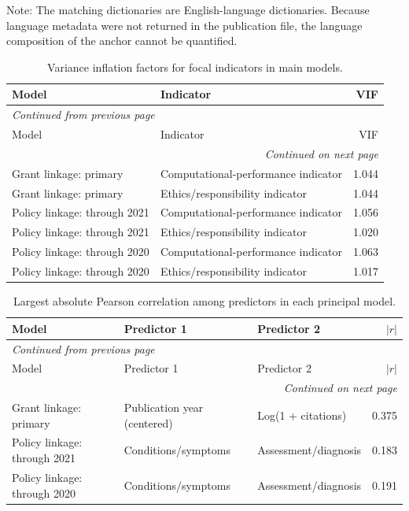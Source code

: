 \documentclass[11pt]{article}
\begin{document}
\noindent\small Note: The matching dictionaries are English-language dictionaries. Because language metadata were not returned in the publication file, the language composition of the anchor cannot be quantified.

\begin{longtable}{p{5.2cm}p{4.0cm}r}
\caption{Variance inflation factors for focal indicators in main models.}\label{tab:s10-vif}\\
\toprule
Model & Indicator & VIF \\
\midrule
\endfirsthead
\multicolumn{3}{l}{\small\itshape Continued from previous page} \\
\toprule
Model & Indicator & VIF \\
\midrule
\endhead
\midrule
\multicolumn{3}{r}{\small\itshape Continued on next page} \\
\endfoot
\bottomrule
\endlastfoot
Grant linkage: primary & Computational-performance indicator & 1.044 \\
Grant linkage: primary & Ethics/responsibility indicator & 1.044 \\
Policy linkage: through 2021 & Computational-performance indicator & 1.056 \\
Policy linkage: through 2021 & Ethics/responsibility indicator & 1.020 \\
Policy linkage: through 2020 & Computational-performance indicator & 1.063 \\
Policy linkage: through 2020 & Ethics/responsibility indicator & 1.017 \\
\end{longtable}

\begin{longtable}{p{4.5cm}p{3.2cm}p{3.2cm}r}
\caption{Largest absolute Pearson correlation among predictors in each principal model.}\label{tab:s11-correlations}\\
\toprule
Model & Predictor 1 & Predictor 2 & $|r|$ \\
\midrule
\endfirsthead
\multicolumn{4}{l}{\small\itshape Continued from previous page} \\
\toprule
Model & Predictor 1 & Predictor 2 & $|r|$ \\
\midrule
\endhead
\midrule
\multicolumn{4}{r}{\small\itshape Continued on next page} \\
\endfoot
\bottomrule
\endlastfoot
Grant linkage: primary & Publication year (centered) & Log(1 + citations) & 0.375 \\
Policy linkage: through 2021 & Conditions/symptoms & Assessment/diagnosis & 0.183 \\
Policy linkage: through 2020 & Conditions/symptoms & Assessment/diagnosis & 0.191 \\
\end{longtable}
\end{document}
